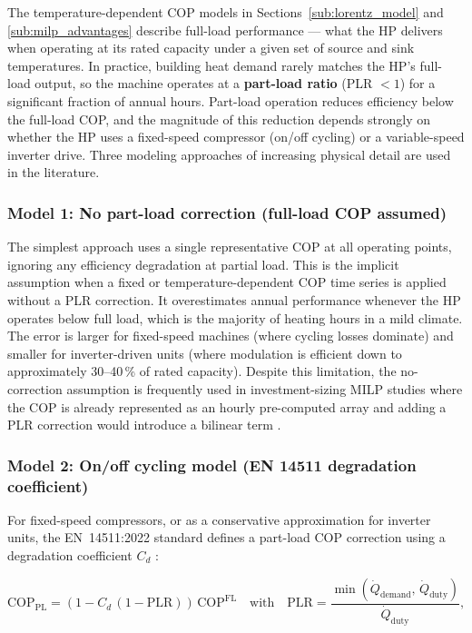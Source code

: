 \documentclass[11pt,a4paper]{report}
\begin{document}
The temperature-dependent COP models in Sections~\ref{sub:lorentz_model} and \ref{sub:milp_advantages} describe full-load performance --- what the HP delivers when operating at its rated capacity under a given set of source and sink temperatures.
In practice, building heat demand rarely matches the HP's full-load output, so the machine operates at a \textbf{part-load ratio} (PLR $< 1$) for a significant fraction of annual hours.
Part-load operation reduces efficiency below the full-load COP, and the magnitude of this reduction depends strongly on whether the HP uses a fixed-speed compressor (on/off cycling) or a variable-speed inverter drive.
Three modeling approaches of increasing physical detail are used in the literature.

\subsubsection{Model 1: No part-load correction (full-load COP assumed)}

The simplest approach uses a single representative COP at all operating points, ignoring any efficiency degradation at partial load.
This is the implicit assumption when a fixed or temperature-dependent COP time series is applied without a PLR correction.
It overestimates annual performance whenever the HP operates below full load, which is the majority of heating hours in a mild climate.
The error is larger for fixed-speed machines (where cycling losses dominate) and smaller for inverter-driven units (where modulation is efficient down to approximately 30--40\,\% of rated capacity).
Despite this limitation, the no-correction assumption is frequently used in investment-sizing MILP studies where the COP is already represented as an hourly pre-computed array and adding a PLR correction would introduce a bilinear term \cite{cardoso2014milp}.

\subsubsection{Model 2: On/off cycling model (EN 14511 degradation coefficient)}

For fixed-speed compressors, or as a conservative approximation for inverter units, the EN~14511:2022 standard defines a part-load COP correction using a degradation coefficient $C_d$ \cite{Grassi2018HP}:

\begin{equation}
\label{eq:pl}
\mathrm{COP}_{\mathrm{PL}} = \left(1 - C_d\,(1 - \mathrm{PLR})\right)\,\mathrm{COP}^{\mathrm{FL}}
\quad\text{with}\quad
\mathrm{PLR} = \frac{\min(\dot{Q}_{\mathrm{demand}},\,\dot{Q}_{\mathrm{duty}})}{\dot{Q}_{\mathrm{duty}}},
\end{equation}
\end{document}
